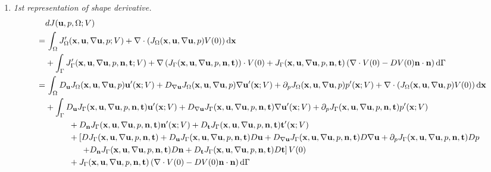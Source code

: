 \documentclass[oneside,11pt]{book}
\numberwithin{equation}{section}
\begin{document}
\begin{enumerate}[leftmargin=0in]
    \item \textit{1st representation of shape derivative.}
    \begin{align*}
        &dJ({\bf u},p,\Omega;V)\\
        =&\, \int_\Omega J_\Omega'({\bf x},{\bf u},\nabla{\bf u},p;V) + \nabla\cdot\left(J_\Omega({\bf x},{\bf u},\nabla{\bf u},p)V(0)\right){\rm d}{\bf x}\\
        &+ \int_\Gamma J_\Gamma'({\bf x},{\bf u},\nabla{\bf u},p,{\bf n},{\bf t};V) + \nabla\left(J_\Gamma({\bf x},{\bf u},\nabla{\bf u},p,{\bf n},{\bf t})\right)\cdot V(0) + J_\Gamma({\bf x},{\bf u},\nabla{\bf u},p,{\bf n},{\bf t})\left(\nabla\cdot V(0) - DV(0){\bf n}\cdot{\bf n}\right){\rm d}\Gamma\\
        =&\, \int_\Omega D_{\bf u}J_\Omega({\bf x},{\bf u},\nabla{\bf u},p){\bf u}'({\bf x};V) + D_{\nabla{\bf u}}J_\Omega({\bf x},{\bf u},\nabla{\bf u},p)\nabla{\bf u}'({\bf x};V) + \partial_pJ_\Omega({\bf x},{\bf u},\nabla{\bf u},p)p'({\bf x};V) + \nabla\cdot\left(J_\Omega({\bf x},{\bf u},\nabla{\bf u},p)V(0)\right){\rm d}{\bf x}\\
        &+ \int_\Gamma D_{\bf u}J_\Gamma({\bf x},{\bf u},\nabla{\bf u},p,{\bf n},{\bf t}){\bf u}'({\bf x};V) + D_{\nabla{\bf u}}J_\Gamma({\bf x},{\bf u},\nabla{\bf u},p,{\bf n},{\bf t})\nabla{\bf u}'({\bf x};V) + \partial_pJ_\Gamma({\bf x},{\bf u},\nabla{\bf u},p,{\bf n},{\bf t})p'({\bf x};V)\\
        &\hspace{1cm}+ D_{\bf n}J_\Gamma({\bf x},{\bf u},\nabla{\bf u},p,{\bf n},{\bf t}){\bf n}'({\bf x};V) + D_{\bf t}J_\Gamma({\bf x},{\bf u},\nabla{\bf u},p,{\bf n},{\bf t}){\bf t}'({\bf x};V)\\
        &\hspace{1cm}+ \left[DJ_\Gamma({\bf x},{\bf u},\nabla{\bf u},p,{\bf n},{\bf t}) + D_{\bf u}J_\Gamma({\bf x},{\bf u},\nabla{\bf u},p,{\bf n},{\bf t})D{\bf u} + D_{\nabla{\bf u}}J_\Gamma({\bf x},{\bf u},\nabla{\bf u},p,{\bf n},{\bf t})D\nabla{\bf u} + \partial_pJ_\Gamma({\bf x},{\bf u},\nabla{\bf u},p,{\bf n},{\bf t})Dp\right.\\
        &\hspace{15mm} \left.+ D_{\bf n}J_\Gamma({\bf x},{\bf u},\nabla{\bf u},p,{\bf n},{\bf t})D{\bf n} + D_{\bf t}J_\Gamma({\bf x},{\bf u},\nabla{\bf u},p,{\bf n},{\bf t})D{\bf t}\right]V(0)\\
        &\hspace{1cm}+ J_\Gamma({\bf x},{\bf u},\nabla{\bf u},p,{\bf n},{\bf t})\left(\nabla\cdot V(0) - DV(0){\bf n}\cdot{\bf n}\right){\rm d}\Gamma\\

\end{align*}
\end{enumerate}
\end{document}
